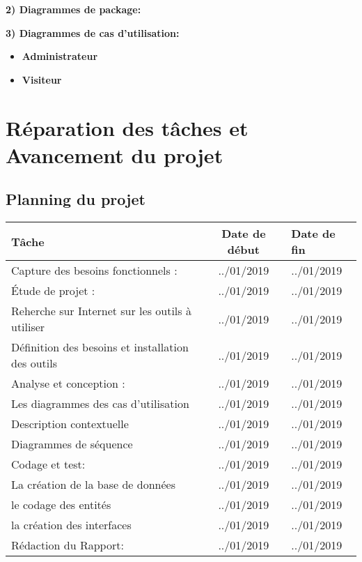 \documentclass[12pt,a4paper]{article}
\begin{document}
 \bf 2) Diagrammes de package:

\bf  3) Diagrammes de cas d'utilisation:
\begin{itemize}
\item \bf Administrateur \\
\item \bf Visiteur
\end{itemize}

\section{Réparation des tâches et Avancement du projet}

\subsection{Planning du projet}

\begin{tabularx}{\textwidth}{|l|c|X|}
  \hline
  \textbf{Tâche } & 
  \textbf{Date de début} & 
  \textbf{Date de fin} \\
  \hline
  \hline
  \hline
  Capture des besoins fonctionnels :& ../01/2019 & ../01/2019
  \\ 
   \hline
    \hline
     \hline
 
 Étude de projet : & ../01/2019 &  ../01/2019
    \\
  \hline
 Reherche sur Internet sur les outils à utiliser  & ../01/2019 &  ../01/2019
    \\
  \hline
 Définition des besoins et installation des outils  & ../01/2019 &  ../01/2019
    \\
  \hline
 \hline
  \hline
  Analyse et conception :& ../01/2019 & ../01/2019
  \\ 
   \hline
  \hline
   \hline
  Les diagrammes des cas d'utilisation & ../01/2019 &  ../01/2019 
    \\
  \hline
 Description contextuelle & ../01/2019 &  ../01/2019
    \\
  \hline
  Diagrammes de séquence & ../01/2019 &  ../01/2019
    \\
    \hline
     \hline
      \hline
 
Codage et test: & ../01/2019 &  ../01/2019
    \\
      \hline
       \hline
        \hline
    
La création de la base de données & ../01/2019 &  ../01/2019
    \\
     \hline
le codage des entités & ../01/2019 &  ../01/2019
    \\
         \hline
la création des interfaces & ../01/2019 &  ../01/2019
    \\
       \hline
        \hline
         \hline

Rédaction du Rapport: & ../01/2019 &  ../01/2019
  \\
  \hline
   \hline
    \hline

\end{tabularx}
\end{document}
